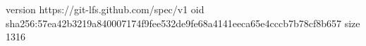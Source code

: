 version https://git-lfs.github.com/spec/v1
oid sha256:57ea42b3219a840007174f9fee532de9fe68a4141eeca65e4cccb7b78cf8b657
size 1316

